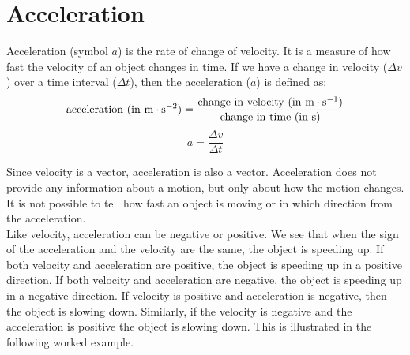 \section{Acceleration}
Acceleration (symbol ${a}$) is the rate of change of velocity. It is a measure of how fast the velocity of an object changes in time. If we have a change in velocity ($\Delta v$) over a time interval ($\Delta t$), then the acceleration (${a}$) is defined as:
\begin{equation*}
\rm{acceleration\ (in\ m}\cdot\rm{s^{-2}}) = \frac{\rm{change\ in\ velocity\ (in\ m}\cdot\rm{s^{-1})}}{\rm{change\ in\ time\ (in\ s)}}
\end{equation*}
\begin{equation*}
a=\frac{\Delta v}{\Delta t}
\end{equation*}\label{eq:pr:acceleration}

Since velocity is a vector, acceleration is also a vector. Acceleration does not provide any information about a motion, but only about how the motion changes. It is not possible to tell how fast an object is moving or in which direction from the acceleration.\\
Like velocity, acceleration can be negative or positive. We see that when the sign of the acceleration and the velocity are the same, the object is speeding up. If both velocity and acceleration are positive, the object is speeding up in a positive direction. If both velocity and acceleration are negative, the object is speeding up in a negative direction.
If velocity is positive and acceleration is negative, then the object is slowing down. Similarly, if the velocity is negative and the acceleration is positive the object is slowing down. This is illustrated in the following worked example.

